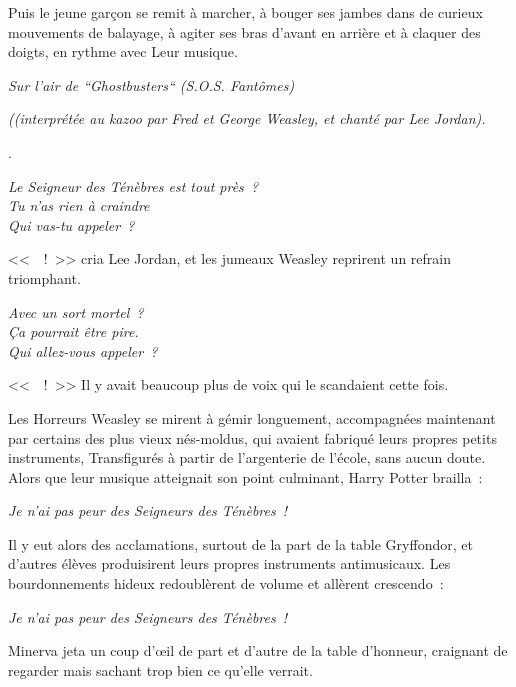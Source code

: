 Puis le jeune garçon se remit à marcher, à bouger ses jambes dans de curieux mouvements de balayage, à agiter ses bras d'avant en arrière et à claquer des doigts, en rythme avec Leur musique.

\begin{center}
\emph{Sur l'air de “Ghostbusters“ (S.O.S. Fantômes)}

\emph{((interprétée au kazoo par Fred et George Weasley,
et chanté par Lee Jordan).}

.

\emph{Le Seigneur des Ténèbres est tout près~?\\
Tu n'as rien à craindre\\
Qui vas-tu appeler~?}
\end{center}

<<~~!~>> cria Lee Jordan, et les jumeaux Weasley reprirent un refrain triomphant.

\begin{center}
\emph{Avec un sort mortel~?\\
Ça pourrait être pire.\\
Qui allez-vous appeler~?}
\end{center}

<<~~!~>> Il y avait beaucoup plus de voix qui le scandaient cette fois.

Les Horreurs Weasley se mirent à gémir longuement, accompagnées maintenant par certains des plus vieux nés-moldus, qui avaient fabriqué leurs propres petits instruments, Transfigurés à partir de l'argenterie de l'école, sans aucun doute. Alors que leur musique atteignait son point culminant, Harry Potter brailla~:

\begin{center}
\emph{Je n'ai pas peur des Seigneurs des Ténèbres~!}
\end{center}

Il y eut alors des acclamations, surtout de la part de la table Gryffondor, et d'autres élèves produisirent leurs propres instruments antimusicaux. Les bourdonnements hideux redoublèrent de volume et allèrent crescendo~:

\begin{center}
\emph{Je n'ai pas peur des Seigneurs des Ténèbres~!}
\end{center}

Minerva jeta un coup d'œil de part et d'autre de la table d'honneur, craignant de regarder mais sachant trop bien ce qu'elle verrait.

